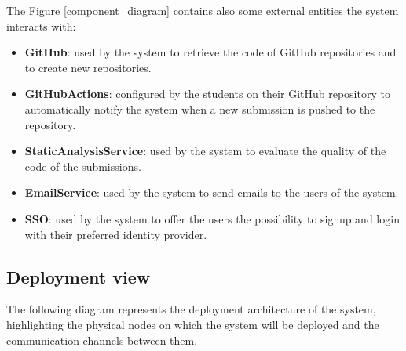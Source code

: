 The Figure \ref{component_diagram} contains also some external entities the system interacts with:
\begin{itemize}
    \item \textbf{GitHub}: used by the system to retrieve the code of GitHub repositories and to create new repositories.
    \item \textbf{GitHubActions}: configured by the students on their GitHub repository to automatically notify the system when a new submission is pushed to the repository.
    \item \textbf{StaticAnalysisService}: used by the system to evaluate the quality of the code of the submissions.
    \item \textbf{EmailService}: used by the system to send emails to the users of the system.
    \item \textbf{SSO}: used by the system to offer the users the possibility to signup and login with their preferred identity provider.
\end{itemize}

\newpage
\subsection{Deployment view}
The following diagram represents the deployment architecture of the system, highlighting the physical nodes on which the system will be deployed and the communication channels between them.

